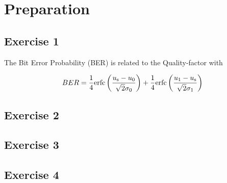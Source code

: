 \chapter{Preparation}


\section{Exercise 1}
The Bit Error Probability (BER) is related to the Quality-factor with

\begin{equation}
BER = \frac{1}{4}\mathrm{erfc}\left(\frac{u_{\mathrm{s}}-u_0}{\sqrt{2}\sigma_0}\right)+\frac{1}{4}\mathrm{erfc}\left(\frac{u_{\mathrm{1}}-u_{\mathrm{s}}}{\sqrt{2}\sigma_1}\right)
\label{eq:}
\end{equation}





\section{Exercise 2}




\section{Exercise 3}



\section{Exercise 4}